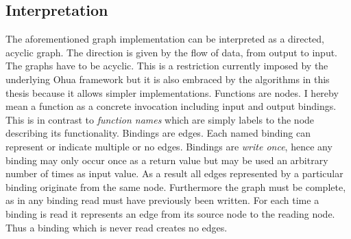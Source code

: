 \subsection{Interpretation}

The aforementioned graph implementation can be interpreted as a directed, acyclic graph.
The direction is given by the flow of data, from output to input.
The graphs have to be acyclic.
This is a restriction currently imposed by the underlying Ohua framework but it is also embraced by the algorithms in this thesis because it allows simpler implementations.
Functions are nodes.
I hereby mean a function as a concrete invocation including input and output bindings.
This is in contrast to \textit{function names} which are simply labels to the node describing its functionality.
Bindings are edges.
Each named binding can represent or indicate multiple or no edges.
Bindings are \textit{write once}, hence any binding may only occur once as a return value but may be used an arbitrary number of times as input value.
As a result all edges represented by a particular binding originate from the same node.
Furthermore the graph must be complete, as in any binding read must have previously been written.
For each time a binding is read it represents an edge from its source node to the reading node.
Thus a binding which is never read creates no edges.
